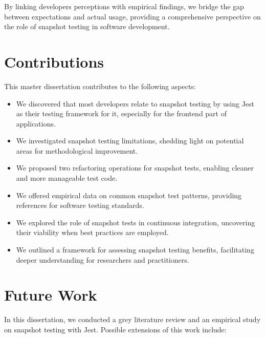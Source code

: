 \documentclass[
	msc, %
	english %
]{../ppgccufmg}
\begin{document}
        By linking developers perceptions with empirical findings, we bridge the gap between expectations and actual usage, providing a comprehensive perspective on the role of snapshot testing in software development.

		\section{Contributions}
        
        \noindent This master dissertation contributes to the following aspects:
        \begin{itemize}
          \item We discovered that most developers relate to snapshot testing by using Jest as their testing framework for it, especially for the frontend part of applications.
          \item We investigated snapshot testing limitations, shedding light on potential areas for methodological improvement.
          \item We proposed two refactoring operations for snapshot tests, enabling cleaner and more manageable test code.
          \item We offered empirical data on common snapshot test patterns, providing references for software testing standards.
          \item We explored the role of snapshot tests in continuous integration, uncovering their viability when best practices are employed.
          \item We outlined a framework for assessing snapshot testing benefits, facilitating deeper understanding for researchers and practitioners.
        \end{itemize}
        
        \section{Future Work}
        
        In this dissertation, we conducted a grey literature review and an empirical study on snapshot testing with Jest. Possible extensions of this work include: 
\end{document}
